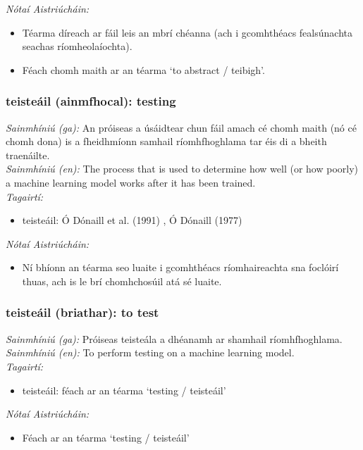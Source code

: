  \noindent \textit{Nótaí Aistriúcháin:}
\begin{itemize}
	\item Téarma díreach ar fáil leis an mbrí chéanna (ach i gcomhthéacs fealsúnachta seachas ríomheolaíochta).
	\item Féach chomh maith ar an téarma `to abstract / teibigh'.
\end{itemize}


\subsubsection*{teisteáil (ainmfhocal): testing}
 \noindent \textit{Sainmhíniú (ga):} An próiseas a úsáidtear chun fáil amach cé chomh maith (nó cé chomh dona) is a fheidhmíonn samhail ríomhfhoghlama tar éis di a bheith traenáilte.
\\
 \noindent \textit{Sainmhíniú (en):} The process that is used to determine how well (or how poorly) a machine learning model works after it has been trained.
\\
 \noindent \textit{Tagairtí:}
\begin{itemize}
	\item teisteáil: Ó Dónaill et al. (1991) \cite{focloir-beag}, Ó Dónaill (1977) \cite{odonaill}
\end{itemize}

 \noindent \textit{Nótaí Aistriúcháin:}
\begin{itemize}
	\item Ní bhíonn an téarma seo luaite i gcomhthéacs ríomhaireachta sna foclóirí thuas, ach is le brí chomhchosúil atá sé luaite.
\end{itemize}


\subsubsection*{teisteáil (briathar): to test}
 \noindent \textit{Sainmhíniú (ga):} Próiseas teisteála a dhéanamh ar shamhail ríomhfhoghlama.
\\
 \noindent \textit{Sainmhíniú (en):} To perform testing on a machine learning model.
\\
 \noindent \textit{Tagairtí:}
\begin{itemize}
	\item teisteáil: féach ar an téarma `testing / teisteáil'
\end{itemize}

 \noindent \textit{Nótaí Aistriúcháin:}
\begin{itemize}
	\item Féach ar an téarma `testing / teisteáil'
\end{itemize}



